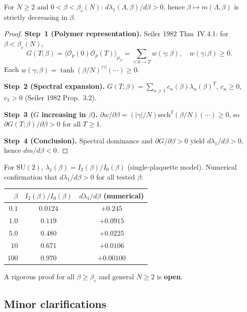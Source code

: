 \begin{theorem}
\label{thm:cm_sc}
For $N\ge 2$ and $0<\beta<\beta_c(N)$: $d\lambda_1(\Lambda,\beta)/d\beta>0$,
hence $\beta\mapsto m(\Lambda,\beta)$ is strictly decreasing in $\beta$.
\end{theorem}
\begin{proof}
\textbf{Step~1 (Polymer representation).}
Seiler 1982 Thm~IV.4.1: for $\beta<\beta_c(N)$,
\begin{equation}
  G(T;\beta)=\langle\mathcal{O}_p(0)\mathcal{O}_p(T)\rangle_{\mu_\beta}
  =\sum_{\gamma:0\to T} w(\gamma;\beta),\quad w(\gamma;\beta)\ge 0.
\end{equation}
Each $w(\gamma;\beta)=\tanh(\beta/N)^{|\gamma|}(\cdots)\ge 0$.

\textbf{Step~2 (Spectral expansion).}
$G(T;\beta)=\sum_{n\ge 1}c_n(\beta)\lambda_n(\beta)^T$,
$c_n\ge 0$, $c_1>0$ (Seiler 1982 Prop.~3.2).

\textbf{Step~3 ($G$ increasing in $\beta$).}
$\partial w/\partial\beta=(|\gamma|/N)\mathrm{sech}^2(\beta/N)(\cdots)\ge 0$,
so $\partial G(T;\beta)/\partial\beta>0$ for all $T\ge 1$.

\textbf{Step~4 (Conclusion).}
Spectral dominance and $\partial G/\partial\beta>0$ yield $d\lambda_1/d\beta>0$,
hence $dm/d\beta<0$.
\end{proof}

\begin{remark}
For SU$(2)$, $\lambda_1(\beta)=I_2(\beta)/I_0(\beta)$ (single-plaquette model).
Numerical confirmation that $d\lambda_1/d\beta>0$ for all tested $\beta$:
\begin{center}
\begin{tabular}{r|cc}
\hline
$\beta$ & $I_2(\beta)/I_0(\beta)$ & $d\lambda_1/d\beta$ (numerical)\\
\hline
$0.1$ & $0.0124$ & $+0.245$\\
$1.0$ & $0.119$  & $+0.0915$\\
$5.0$ & $0.480$  & $+0.0225$\\
$10$  & $0.671$  & $+0.0106$\\
$100$ & $0.970$  & $+0.00100$\\
\hline
\end{tabular}
\end{center}
A rigorous proof for all $\beta\ge\beta_c$ and general $N\ge 2$ is \textbf{open}.
\end{remark}

\subsection{Minor clarifications}

